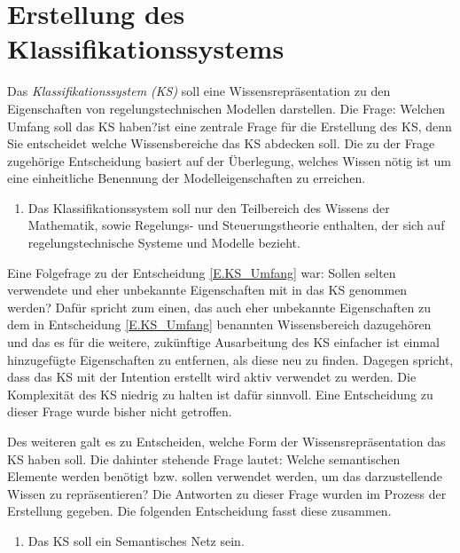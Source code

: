 \section{Erstellung des Klassifikationssystems}
\label{Ch:Vorbetrachtung:Sec:KS}
Das \textit{Klassifikationssystem (KS)} soll eine Wissensrepräsentation zu den Eigenschaften von regelungstechnischen Modellen darstellen. 
Die Frage: \glqq Welchen Umfang soll das KS haben?\grqq ist eine zentrale Frage für die Erstellung des KS, denn Sie entscheidet welche Wissensbereiche das KS abdecken soll. Die zu der Frage zugehörige Entscheidung basiert auf der Überlegung, welches Wissen nötig ist um eine einheitliche Benennung der Modelleigenschaften zu erreichen. 
\begin{enumerate}[resume*]
	\item \label{E.KS_Umfang}Das Klassifikationssystem soll nur den Teilbereich des Wissens der Mathematik, sowie Regelungs- und Steuerungstheorie enthalten, der sich auf regelungstechnische Systeme und Modelle bezieht.
\end{enumerate}

Eine Folgefrage zu der Entscheidung \ref{E.KS_Umfang} war: Sollen selten verwendete und eher unbekannte Eigenschaften mit in das KS genommen werden? Dafür spricht zum einen, das auch eher unbekannte Eigenschaften zu dem in Entscheidung \ref{E.KS_Umfang} benannten Wissensbereich dazugehören und das es für die weitere, zukünftige Ausarbeitung des KS einfacher ist einmal hinzugefügte Eigenschaften zu entfernen, als diese neu zu finden. Dagegen spricht, dass das KS mit der Intention erstellt wird aktiv verwendet zu werden. Die Komplexität des KS niedrig zu halten ist dafür sinnvoll. Eine Entscheidung zu dieser Frage wurde bisher nicht getroffen.

Des weiteren galt es zu Entscheiden, welche Form der Wissensrepräsentation das KS haben soll. Die dahinter stehende Frage lautet: Welche semantischen Elemente werden benötigt bzw. sollen verwendet werden, um das darzustellende Wissen zu repräsentieren? Die Antworten zu dieser Frage wurden im Prozess der Erstellung gegeben. Die folgenden Entscheidung fasst diese zusammen.
\begin{enumerate}[resume*]
	\item \label{E.KS_SemantischesNetz}Das KS soll ein Semantisches Netz sein. %
\end{enumerate}

